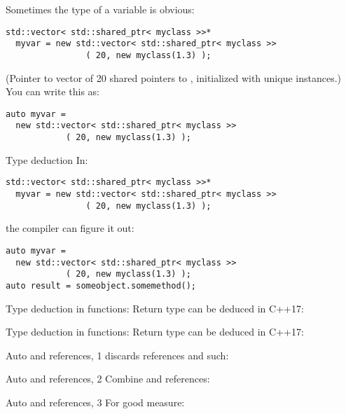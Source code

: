 Sometimes the type of a variable is obvious:
\begin{verbatim}
std::vector< std::shared_ptr< myclass >>*
  myvar = new std::vector< std::shared_ptr< myclass >>
                ( 20, new myclass(1.3) );
\end{verbatim}
(Pointer to vector of 20 shared pointers to , initialized
with unique instances.)  You can write this as:
\begin{verbatim}
auto myvar =
  new std::vector< std::shared_ptr< myclass >>
            ( 20, new myclass(1.3) );
\end{verbatim}

\begin{slide}{Type deduction}
  \label{sl:auto-deduct}
In:
\begin{verbatim}
std::vector< std::shared_ptr< myclass >>*
  myvar = new std::vector< std::shared_ptr< myclass >>
                ( 20, new myclass(1.3) );
\end{verbatim}
the compiler can figure it out:
\begin{verbatim}
auto myvar =
  new std::vector< std::shared_ptr< myclass >>
            ( 20, new myclass(1.3) );
auto result = someobject.somemethod();
\end{verbatim}
\end{slide}

\begin{block}{Type deduction in functions}:
  \label{sl:auto-fun}
  Return type can be deduced in C++17:
\end{block}

\begin{block}{Type deduction in functions}:
  \label{sl:auto-method}
  Return type can be deduced in C++17:
\end{block}

\begin{block}{Auto and references, 1}
  \label{sl:auto-ref1}
   discards references and such:
\end{block}

\begin{block}{Auto and references, 2}
  \label{sl:auto-ref2}
  Combine  and references:
\end{block}

\begin{block}{Auto and references, 3}
  \label{sl:auto-ref3}
  For good measure:
\end{block}

